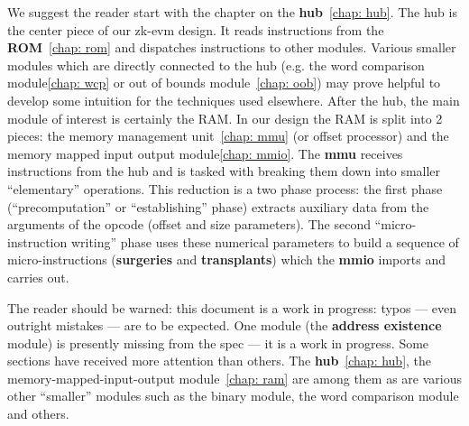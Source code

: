 We suggest the reader start with the chapter on the \textbf{hub}~\ref{chap: hub}. The hub is the center piece of our zk-evm design. It reads instructions from the \textbf{ROM}~\ref{chap: rom} and dispatches instructions to other modules. Various smaller modules which are directly connected to the hub (e.g. the word comparison module\ref{chap: wcp} or out of bounds module~\ref{chap: oob}) may prove helpful to develop some intuition for the techniques used elsewhere. After the hub, the main module of interest is certainly the RAM. In our design the RAM is split into 2 pieces: the memory management unit~\ref{chap: mmu} (or offset processor) and the memory mapped input output module\ref{chap: mmio}. The \textbf{mmu} receives instructions from the hub and is tasked with breaking them down into smaller ``elementary'' operations. This reduction is a two phase process: the first phase (``precomputation'' or ``establishing'' phase) extracts auxiliary data from the arguments of the opcode (offset and size parameters). The second ``micro-instruction writing'' phase uses these numerical parameters to build a sequence of micro-instructions (\textbf{surgeries} and \textbf{transplants}) which the \textbf{mmio} imports and carries out.

The reader should be warned: this document is a work in progress: typos --- even outright mistakes --- are to be expected. One module (the \textbf{address existence} module) is presently missing from the spec --- it is a work in progress. Some sections have received more attention than others. The \textbf{hub}~\ref{chap: hub}, the memory-mapped-input-output module~\ref{chap: ram} are among them as are various other ``smaller'' modules such as the binary module, the word comparison module and others.
